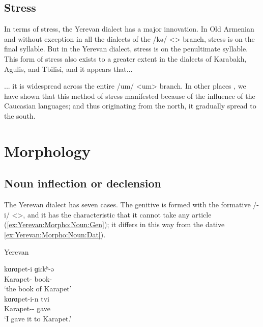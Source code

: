 \subsection{Stress}\label{sec:Yerevan:phono:stress}

In terms of stress, the Yerevan dialect has a major innovation. In Old Armenian and without exception in all the dialects of the /kə/ <> branch, stress is on the final syllable. But in the Yerevan dialect, stress is on the penultimate syllable. This form of stress also exists to a greater extent in the dialects of Karabakh, Agulis, and Tbilisi, and it appears that... 

\begin{adjarianpage}\label{page:41}\end{adjarianpage}%

... it is widespread across the entire /um/ <um> branch. In other places \citep[185]{Adjarian-1901-Kharabagh}, we have shown that this method of stress manifested because of the influence of the Caucasian languages; and thus originating from the north, it gradually spread to the south. 

\section{Morphology}

\subsection{Noun inflection or declension}

The Yerevan dialect has seven cases. The genitive is formed with the formative /-i/ <>, and it has the characteristic that it cannot take any article (\ref{ex:Yerevan:Morpho:Noun:Gen}); it differs in this way from the dative \ref{ex:Yerevan:Morpho:Noun:Dat}). 

\begin{exe}
	\ex Yerevan\begin{xlist}
		\ex \gll kɑɾɑpet-i ɡiɾkʰ-ə \\
		Karapet-{\gen} book-{} \\
		\trans `the book of Karapet' \label{ex:Yerevan:Morpho:Noun:Gen}\\
		\ex \gll kɑɾɑpet-i-n tvi \\
		Karapet-{\dat}-{} gave \\
		\trans `I gave it to Karapet.' \label{ex:Yerevan:Morpho:Noun:Dat}
		\\  
	\end{xlist}
\end{exe}


